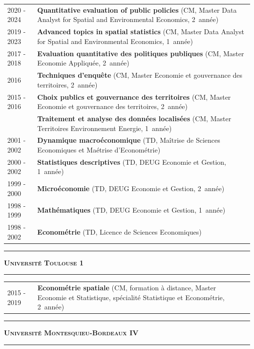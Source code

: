 \documentclass[a4paper,12pt]{article}
\newcommand{\titre}[1]{%
	\bigskip
	\noindent \rule[2mm]{\textwidth}{0.5pt}
	\textbf{\textsc{\large #1}} \\
	\noindent \rule[1mm]{\textwidth}{0.5pt}
	}
\begin{document}
\noindent \begin{longtable}{@{}p{\annee}p{\texte}@{}}
2020 -	2024 & \textbf{Quantitative evaluation of public policies} (CM, Master Data Analyst for Spatial and Environmental Economics, 2\ieme{}~année) \\
2019 -	2023 & \textbf{Advanced topics in spatial statistics} (CM, Master Data Analyst for Spatial and Environmental Economics, 1\iere{}~année) \\
2017 - 2018	& \textbf{Evaluation quantitative des politiques publiques} (CM, Master Economie Appliquée, 2\ieme{}~année) \\
2016		& \textbf{Techniques d'enquête} (CM, Master Economie et gouvernance des territoires, 2\ieme{}~année) \\
2015 - 2016	& \textbf{Choix publics et gouvernance des territoires} (CM, Master Economie et gouvernance des territoires, 2\ieme{}~année) \\
			& \textbf{Traitement et analyse des données localisées} (CM, Master Territoires Environnement Energie, 1\iere{}~année) \\
2001 - 2002 & \textbf{Dynamique macroéconomique} (TD, Maîtrise de Sciences Economiques et Maétrise d'Econométrie) \\
2000 - 2002 & \textbf{Statistiques descriptives} (TD, DEUG Economie et Gestion, 1\iere{}~année) \\
1999 - 2000 & \textbf{Microéconomie} (TD, DEUG Economie et Gestion, 2\ieme{}~année) \\
1998 - 1999 & \textbf{Mathématiques} (TD, DEUG Economie et Gestion, 1\iere{}~année) \\
1998 - 2002 & \textbf{Econométrie} (TD, Licence de Sciences Economiques)
\end{longtable}


\titre{Université Toulouse 1}

\noindent \begin{longtable}{@{}p{\annee}p{\texte}@{}}
2015 - 2019 & \textbf{Econométrie spatiale} (CM, formation à distance, Master Economie et Statistique, spécialité Statistique et Econométrie, 2\ieme{}~année) \\
\end{longtable}


\titre{Université Montesquieu-Bordeaux IV}
\end{document}
